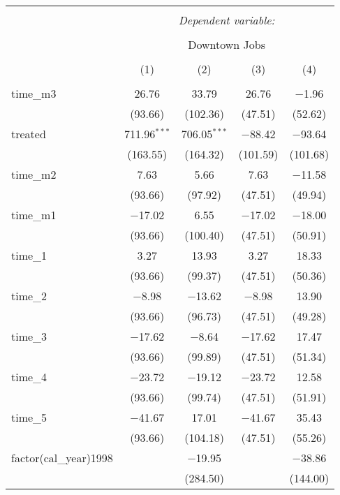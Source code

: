 
\begin{table}[!htbp] \centering 
  \caption{} 
  \label{} 
\tiny 
\begin{tabular}{@{\extracolsep{5pt}}lcccc} 
\\[-1.8ex]\hline 
\hline \\[-1.8ex] 
 & \multicolumn{4}{c}{\textit{Dependent variable:}} \\ 
\cline{2-5} 
\\[-1.8ex] & \multicolumn{4}{c}{Downtown Jobs} \\ 
\\[-1.8ex] & (1) & (2) & (3) & (4)\\ 
\hline \\[-1.8ex] 
 time\_m3 & 26.76 & 33.79 & 26.76 & $-$1.96 \\ 
  & (93.66) & (102.36) & (47.51) & (52.62) \\ 
  treated & 711.96$^{***}$ & 706.05$^{***}$ & $-$88.42 & $-$93.64 \\ 
  & (163.55) & (164.32) & (101.59) & (101.68) \\ 
  time\_m2 & 7.63 & 5.66 & 7.63 & $-$11.58 \\ 
  & (93.66) & (97.92) & (47.51) & (49.94) \\ 
  time\_m1 & $-$17.02 & 6.55 & $-$17.02 & $-$18.00 \\ 
  & (93.66) & (100.40) & (47.51) & (50.91) \\ 
  time\_1 & 3.27 & 13.93 & 3.27 & 18.33 \\ 
  & (93.66) & (99.37) & (47.51) & (50.36) \\ 
  time\_2 & $-$8.98 & $-$13.62 & $-$8.98 & 13.90 \\ 
  & (93.66) & (96.73) & (47.51) & (49.28) \\ 
  time\_3 & $-$17.62 & $-$8.64 & $-$17.62 & 17.47 \\ 
  & (93.66) & (99.89) & (47.51) & (51.34) \\ 
  time\_4 & $-$23.72 & $-$19.12 & $-$23.72 & 12.58 \\ 
  & (93.66) & (99.74) & (47.51) & (51.91) \\ 
  time\_5 & $-$41.67 & 17.01 & $-$41.67 & 35.43 \\ 
  & (93.66) & (104.18) & (47.51) & (55.26) \\ 
  factor(cal\_year)1998 &  & $-$19.95 &  & $-$38.86 \\ 
  &  & (284.50) &  & (144.00) \\ 

\end{tabular}
\end{table}
